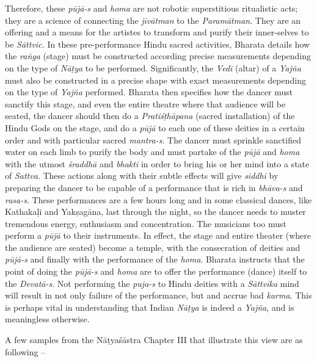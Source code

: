 Therefore, these \textit{pūjā-s} and \textit{homa} are not robotic superstitious ritualistic acts; they are a science of connecting the \textit{jīvātman} to the \textit{Paramātman}. They are an offering and a means for the artistes to transform and purify their inner-selves to be \textit{Sāttvic. }In these pre-performance Hindu sacred activities, Bharata details how the \textit{raṅga} (stage) must be constructed according precise measurements depending on the type of \textit{Nāṭya }to be performed. Significantly, the \textit{Vedī} (altar) of a \textit{Yajña} must also be constructed in a precise shape with exact measurements depending on the type of \textit{Yajña} performed. Bharata then specifies how the dancer must sanctify this stage, and even the entire theatre where that audience will be seated, the dancer should then do a \textit{Pratiśṭhāpana} (sacred installation) of the Hindu Gods on the stage, and do a \textit{pūjā }to each one of these deities in a certain order and with particular sacred \textit{mantra-s}. The dancer must sprinkle sanctified water on each limb to purify the body and must partake of the \textit{pūjā }and \textit{homa} with the utmost \textit{śraddhā} and \textit{bhakti }in order to bring his or her mind into a state of \textit{Sattva}. These actions along with their subtle effects will give \textit{siddhi} by preparing the dancer to be capable of a performance that is rich in \textit{bhāva-s} and \textit{rasa-s}. These performances are a few hours long and in some classical dances, like Kathakaḷi and Yakṣagāna, last through the night, so the dancer needs to muster tremendous energy, enthusiasm and concentration. The musicians too must perform a \textit{pūjā }to their instruments. In effect, the stage and entire theater (where the audience are seated) become a temple, with the consecration of deities and \textit{pūjā-s} and finally with the performance of the \textit{homa}. Bharata instructs that the point of doing the \textit{pūjā-s} and \textit{homa} are to offer the performance (dance) itself to the \textit{Devatā-s}. Not performing the \textit{puja-s} to Hindu deities with a \textit{Sāttvika} mind will result in not only failure of the performance, but and accrue bad \textit{karma}. This is perhaps vital in understanding that Indian \textit{Nāṭya} is indeed a \textit{Yajña}, and is meaningless otherwise.

A few samples from the Nāṭyaśāstra Chapter III that illustrate this view are as following –

